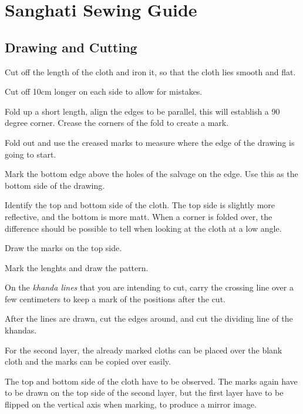 \chapter{Sanghati Sewing Guide}

\section{Drawing and Cutting}

Cut off the length of the cloth and iron it, so that the cloth lies
smooth and flat.

Cut off 10cm longer on each side to allow for mistakes.

Fold up a short length, align the edges to be parallel, this will
establish a 90 degree corner. Crease the corners of the fold to create a
mark.


Fold out and use the creased marks to measure where the edge of the
drawing is going to start.

Mark the bottom edge above the holes of the salvage on the edge. Use
this as the bottom side of the drawing.

Identify the top and bottom side of the cloth. The top side is slightly
more reflective, and the bottom is more matt. When a corner is folded
over, the difference should be possible to tell when looking at the
cloth at a low angle.


Draw the marks on the top side.

Mark the lenghts and draw the pattern.

On the \emph{khanda lines} that you are intending to cut, carry the
crossing line over a few centimeters to keep a mark of the positions
after the cut.


After the lines are drawn, cut the edges around, and cut the dividing
line of the khandas.

For the second layer, the already marked cloths can be placed over the
blank cloth and the marks can be copied over easily.

The top and bottom side of the cloth have to be observed. The marks
again have to be drawn on the top side of the second layer, but the
first layer have to be flipped on the vertical axis when marking, to
produce a mirror image.


